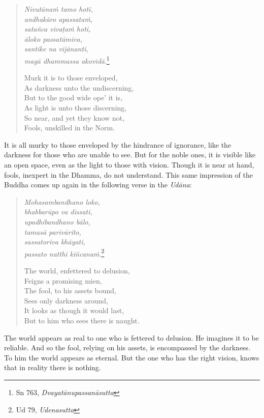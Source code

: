 \begin{quote}
\emph{Nivutānaṁ tamo hoti,}\\
\emph{andhakāro apassataṁ,}\\
\emph{satañca vivaṭaṁ hoti,}\\
\emph{āloko passatāmiva,}\\
\emph{santike na vijānanti,}\\
\emph{magā dhammassa akovidā}.\footnote{Sn 763, \emph{Dvayatānupassanāsutta}}

Murk it is to those enveloped,\\
As darkness unto the undiscerning,\\
But to the good wide ope' it is,\\
As light is unto those discerning,\\
So near, and yet they know not,\\
Fools, unskilled in the Norm.
\end{quote}

It is all murky to those enveloped by the hindrance of ignorance, like the darkness for those who are unable to see. But for the noble ones, it is visible like an open space, even as the light to those with vision. Though it is near at hand, fools, inexpert in the Dhamma, do not understand. This same impression of the Buddha comes up again in the following verse in the \emph{Udāna}:

\begin{quote}
\emph{Mohasambandhano loko,}\\
\emph{bhabbarūpo va dissati,}\\
\emph{upadhibandhano bālo,}\\
\emph{tamasā parivārito,}\\
\emph{sassatoriva khāyati,}\\
\emph{passato natthi kiñcanaṁ}.\footnote{Ud 79, \emph{Udenasutta}}

The world, enfettered to delusion,\\
Feigns a promising mien,\\
The fool, to his assets bound,\\
Sees only darkness around,\\
It looks as though it would last,\\
But to him who sees there is naught.
\end{quote}

The world appears as real to one who is fettered to delusion. He imagines it to be reliable. And so the fool, relying on his assets, is encompassed by the darkness. To him the world appears as eternal. But the one who has the right vision, knows that in reality there is nothing.

